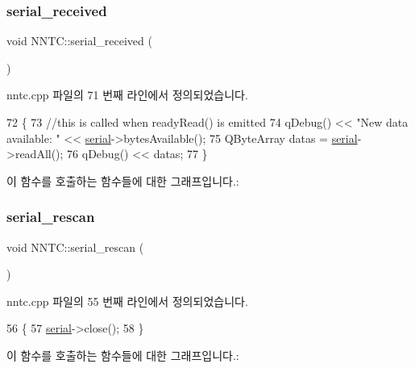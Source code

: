 \subsubsection{\texorpdfstring{serial\+\_\+received}{serial\_received}}
{\footnotesize\ttfamily void N\+N\+T\+C\+::serial\+\_\+received (\begin{DoxyParamCaption}{ }\end{DoxyParamCaption})\hspace{0.3cm}{\ttfamily [slot]}}



nntc.\+cpp 파일의 71 번째 라인에서 정의되었습니다.


\begin{DoxyCode}
72 \{
73     \textcolor{comment}{//this is called when readyRead() is emitted}
74     qDebug() << \textcolor{stringliteral}{"New data available: "} << \mbox{\hyperlink{nntc_8cpp_ae6fc1d9226a3b8046c907909a550dbe7}{serial}}->bytesAvailable();
75     QByteArray datas = \mbox{\hyperlink{nntc_8cpp_ae6fc1d9226a3b8046c907909a550dbe7}{serial}}->readAll();
76     qDebug() << datas;
77 \}
\end{DoxyCode}
이 함수를 호출하는 함수들에 대한 그래프입니다.\+:
\mbox{\label{class_n_n_t_c_a5c1cdbe97b81d19b31ff07e9ca413be2}} 
\subsubsection{\texorpdfstring{serial\+\_\+rescan}{serial\_rescan}}
{\footnotesize\ttfamily void N\+N\+T\+C\+::serial\+\_\+rescan (\begin{DoxyParamCaption}{ }\end{DoxyParamCaption})\hspace{0.3cm}{\ttfamily [slot]}}



nntc.\+cpp 파일의 55 번째 라인에서 정의되었습니다.


\begin{DoxyCode}
56 \{
57     \mbox{\hyperlink{nntc_8cpp_ae6fc1d9226a3b8046c907909a550dbe7}{serial}}->close();
58 \}
\end{DoxyCode}
이 함수를 호출하는 함수들에 대한 그래프입니다.\+:
\mbox{\label{class_n_n_t_c_ac33ec4d5e113accf260bc4b4d9f77338}} 
